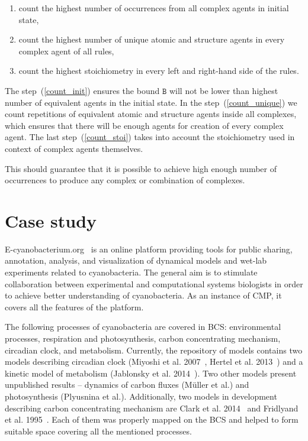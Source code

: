 \documentclass[12pt, twoside]{fithesis2} %
\begin{document}
\begin{enumerate}
  \item \label{count_init} count the highest number of occurrences from all complex agents in initial state,
  \item \label{count_unique} count the highest number of unique atomic and structure agents in every complex agent of all rules,
  \item \label{count_stoi} count the highest stoichiometry in every left and right-hand side of the rules.
\end{enumerate}

The step~(\ref{count_init}) ensures the bound $\mathtt{B}$ will not be lower than highest number of equivalent agents in the initial state. In the step~(\ref{count_unique}) we count repetitions of equivalent atomic and structure agents inside all complexes, which ensures that there will be enough agents for creation of every complex agent. The last step~(\ref{count_stoi}) takes into account the stoichiometry used in context of complex agents themselves.

This should guarantee that it is possible to achieve high enough number of occurrences to produce any complex or combination of complexes.

\chapter{Case study}
\label{case_study}

E-cyanobacterium.org~\cite{Trojak2016} is an online platform providing tools for public sharing, annotation, analysis, and visualization of dynamical models and wet-lab experiments related to cyanobacteria. The general aim is to stimulate collaboration between experimental and computational systems biologists in order to achieve better understanding of cyanobacteria. As an instance of CMP, it covers all the features of the platform.

The following processes of cyanobacteria are covered in BCS: environmental processes, respiration and photosynthesis, carbon concentrating mechanism, circadian clock, and metabolism. Currently, the repository of models contains two models describing circadian clock (Miyoshi et al. 2007~\cite{Miyoshi01022007}, Hertel et al. 2013~\cite{Hertel2013}) and a kinetic model of metabolism (Jablonsky et al. 2014~\cite{Jablonsky2014}). Two other models present unpublished results -- dynamics of carbon fluxes (M\"{u}ller et al.) and photosynthesis (Plyusnina et al.). Additionally, two models in development describing carbon concentrating mechanism are Clark et al. 2014~\cite{clark2014insights} and Fridlyand et al. 1995~\cite{fridlyand1996quantitative}. Each of them was properly mapped on the BCS and helped to form suitable space covering all the mentioned processes.
\end{document}
